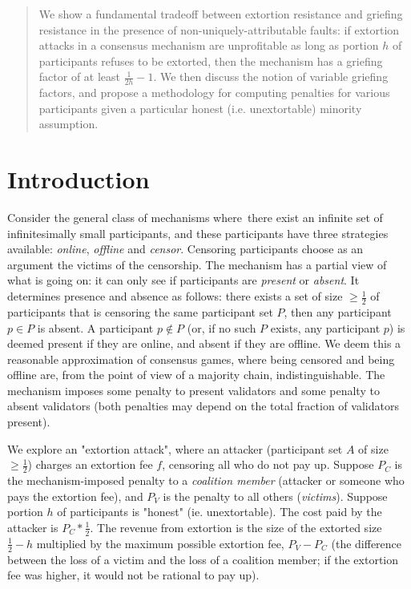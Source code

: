 \documentclass[12pt]{article}
\begin{document}
\maketitle
\begin{abstract}
We show a fundamental tradeoff between extortion resistance and griefing resistance in the presence of non-uniquely-attributable faults: if extortion attacks in a consensus mechanism are unprofitable as long as portion $h$ of participants refuses to be extorted, then the mechanism has a griefing factor of at least $\frac{1}{2h} - 1$. We then discuss the notion of variable griefing factors, and propose a methodology for computing penalties for various participants given a particular honest (i.e. unextortable) minority assumption.
\end{abstract}

\section{Introduction}
Consider the general class of mechanisms where there exist an infinite set of infinitesimally small participants, and these participants have three strategies available: \textit{online}, \textit{offline} and \textit{censor}. Censoring participants choose as an argument the victims of the censorship. The mechanism has a partial view of what is going on: it can only see if participants are \textit{present} or \textit{absent}. It determines presence and absence as follows: there exists a set of size $\ge \frac{1}{2}$ of participants that is censoring the same participant set $P$, then any participant $p \in P$ is absent. A participant $p \not \in P$ (or, if no such $P$ exists, any participant $p$) is deemed present if they are online, and absent if they are offline. We deem this a reasonable approximation of consensus games, where being censored and being offline are, from the point of view of a majority chain, indistinguishable. The mechanism imposes some penalty to present validators and some penalty to absent validators (both penalties may depend on the total fraction of validators present).

We explore an "extortion attack", where an attacker (participant set $A$ of size $\ge \frac{1}{2}$) charges an extortion fee $f$, censoring all who do not pay up. Suppose $P_C$ is the mechanism-imposed penalty to a \textit{coalition member} (attacker or someone who pays the extortion fee), and $P_V$ is the penalty to all others (\textit{victims}). Suppose portion $h$ of participants is "honest" (ie. unextortable). The cost paid by the attacker is $P_C * \frac{1}{2}$. The revenue from extortion is the size of the extorted size $\frac{1}{2} - h$ multiplied by the maximum possible extortion fee, $P_V - P_C$ (the difference between the loss of a victim and the loss of a coalition member; if the extortion fee was higher, it would not be rational to pay up).
\end{document}

